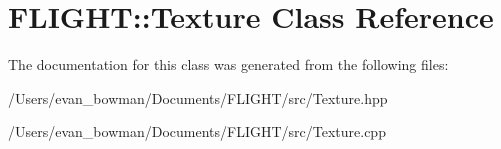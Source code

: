 \hypertarget{class_f_l_i_g_h_t_1_1_texture}{}\section{F\+L\+I\+G\+HT\+:\+:Texture Class Reference}
\label{class_f_l_i_g_h_t_1_1_texture}


The documentation for this class was generated from the following files\+:\begin{DoxyCompactItemize}
\item 
/\+Users/evan\+\_\+bowman/\+Documents/\+F\+L\+I\+G\+H\+T/src/Texture.\+hpp\item 
/\+Users/evan\+\_\+bowman/\+Documents/\+F\+L\+I\+G\+H\+T/src/Texture.\+cpp\end{DoxyCompactItemize}
